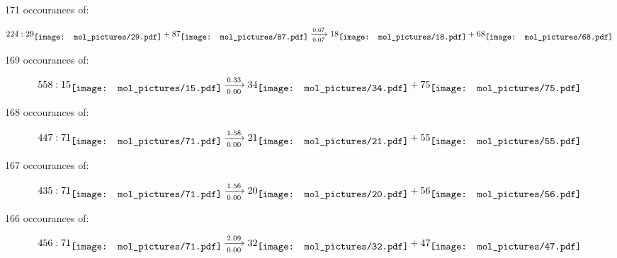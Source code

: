 \documentclass{article}
\begin{document}
\vspace{1cm}


171 occourances of:

$$
224:  
29
\raisebox{-.5\height}{\texttt{[image: mol\_pictures/29.pdf]}}
+
87
\raisebox{-.5\height}{\texttt{[image: mol\_pictures/87.pdf]}}
\xrightarrow[0.07]{0.67}
18
\raisebox{-.5\height}{\texttt{[image: mol\_pictures/18.pdf]}}
+
68
\raisebox{-.5\height}{\texttt{[image: mol\_pictures/68.pdf]}}
$$



\vspace{1cm}


169 occourances of:

$$
558:  
15
\raisebox{-.5\height}{\texttt{[image: mol\_pictures/15.pdf]}}
\xrightarrow[0.00]{0.33}
34
\raisebox{-.5\height}{\texttt{[image: mol\_pictures/34.pdf]}}
+
75
\raisebox{-.5\height}{\texttt{[image: mol\_pictures/75.pdf]}}
$$



\vspace{1cm}


168 occourances of:

$$
447:  
71
\raisebox{-.5\height}{\texttt{[image: mol\_pictures/71.pdf]}}
\xrightarrow[0.00]{1.58}
21
\raisebox{-.5\height}{\texttt{[image: mol\_pictures/21.pdf]}}
+
55
\raisebox{-.5\height}{\texttt{[image: mol\_pictures/55.pdf]}}
$$



\vspace{1cm}


167 occourances of:

$$
435:  
71
\raisebox{-.5\height}{\texttt{[image: mol\_pictures/71.pdf]}}
\xrightarrow[0.00]{1.56}
20
\raisebox{-.5\height}{\texttt{[image: mol\_pictures/20.pdf]}}
+
56
\raisebox{-.5\height}{\texttt{[image: mol\_pictures/56.pdf]}}
$$



\vspace{1cm}


166 occourances of:

$$
456:  
71
\raisebox{-.5\height}{\texttt{[image: mol\_pictures/71.pdf]}}
\xrightarrow[0.00]{2.09}
32
\raisebox{-.5\height}{\texttt{[image: mol\_pictures/32.pdf]}}
+
47
\raisebox{-.5\height}{\texttt{[image: mol\_pictures/47.pdf]}}
$$
\end{document}
